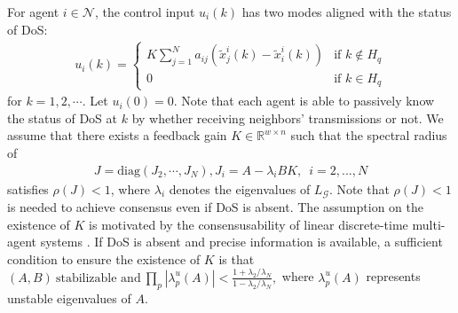 \documentclass[letterpaper,journal,final,twocolumn]{IEEEtran}
\begin{document}
For agent $i\in \mathcal N$, the control input $u_i(k)$ has two modes aligned with the status of DoS: 
\begin{align}\label{controller0}
u_i(k) = 
\left\{
\begin{array}{ll}
K \sum_{j=1} ^{N} a_{ij} (\tilde x_j ^ i (k) - \tilde x_i ^ i (k)) &\text{if}\,\,k \notin H_q \\
0 & \text{if}\,\, k \in H_q
\end{array}
\right.
\end{align}
for $k=1, 2, \cdots$. Let $u_i(0)=0$. Note that each agent is able to passively know the status of DoS at $k$ by whether receiving neighbors' transmissions or not. 
We assume that there exists a feedback gain $K \in \mathbb R ^{w \times n}$ such that the spectral radius of
\begin{align}
J= \text{diag}(J_2,  \cdots, J_N), J_i=A- \lambda_i BK,\,\,\, i=2,...,N 
\end{align}
satisfies $\rho(J) < 1$, where $\lambda_i$ denotes the eigenvalues of $L _{\mathcal G}$. Note that $\rho(J) < 1$ is needed to achieve consensus even if DoS is absent. The assumption on the existence of $K$ is motivated by the consensusability of linear discrete-time multi-agent systems \cite{you2011network}. If DoS is absent and precise information is available, a sufficient condition to ensure the existence of $K$ is that
$
		(A,B) ~\textrm{stabilizable and} ~\prod_{p}|\lambda_p^u(A)|<\frac{1+\lambda_2/\lambda_N}{1-\lambda_2/\lambda_N}, 
$
	where $\lambda_p^u(A)$ represents unstable eigenvalues of $A$.
\end{document}
